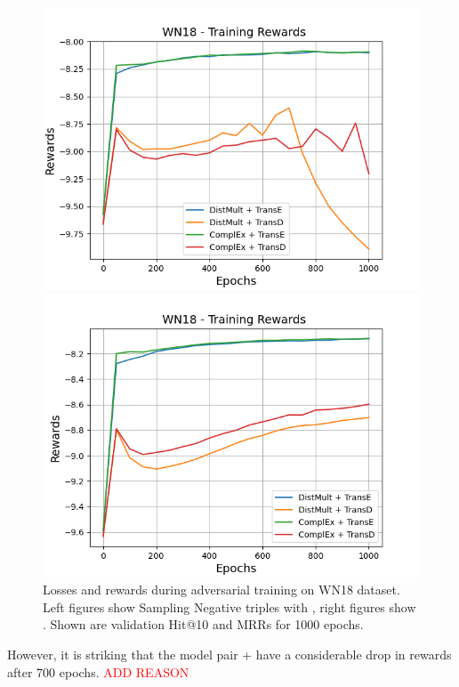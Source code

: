 \begin{figure}
\begin{minipage}{.5\textwidth}
      \includegraphics[width=0.9\linewidth]{figures/results/gan_train/not_pretrained/uncertainty/max/entropy/wn18/uncertainty_wn18_rew.png}
    \end{minipage}%
    \begin{minipage}{.5\textwidth}
      \centering
      \includegraphics[width=0.9\linewidth]{figures/results/gan_train/not_pretrained/uncertainty/max_distribution/entropy/wn18/uncertainty_wn18_rew.png}
    \end{minipage}%
    \caption{Losses and rewards during adversarial training on \textsc{WN18} dataset. 
    Left figures show Sampling Negative triples with \usmax, right figures show \ussoftmax.
    Shown are validation Hit@10 and MRRs for 1000 epochs.}
    \label{fig:advtrain_wn18_usmax_ussoftmax_losses_rewards}
\end{figure}
However, it is striking that the model pair \dismult + \transd have a considerable drop in rewards after 700 epochs.
\textcolor{red}{ADD REASON}


